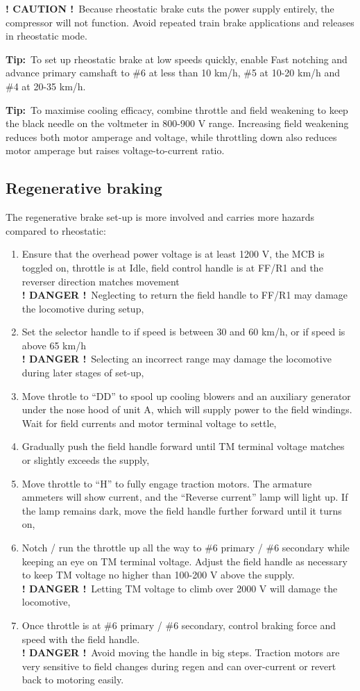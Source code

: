 \documentclass[11pt, a4paper]{article}
\newcommand{\brakemode}[1]{%
    \begingroup
    \setlength{\fboxsep}{0pt}%
    \raisebox{0.1em}{%
        \colorbox{red}{%
            \parbox[c][1.4em][c]{1.4em}{%
                \centering
                \color{black}\bfseries #1%
            }%
        }%
    }%
    \endgroup
}
\newcommand{\danger}{\textbf{\color{red} ! DANGER !}}
\newcommand{\caution}{\textbf{\color{orange} ! CAUTION !}}
\newcommand{\Tip}{\textbf{Tip:}}
\begin{document}
\caution\ Because rheostatic brake cuts the power supply entirely, the compressor will not function. Avoid repeated train brake applications and releases in rheostatic mode.

\Tip\ To set up rheostatic brake at low speeds quickly, enable Fast notching and advance primary camshaft to \#6 at less than 10 km/h, \#5 at 10-20 km/h and \#4 at 20-35 km/h.

\Tip\ To maximise cooling efficacy, combine throttle and field weakening to keep the black needle on the voltmeter in 800-900 V range. Increasing field weakening reduces both motor amperage and voltage, while throttling down also reduces motor amperage but raises voltage-to-current ratio.
\newpage

\subsection{Regenerative braking}
The regenerative brake set-up is more involved and carries more hazards compared to rheostatic:
\begin{enumerate}
\item Ensure that the overhead power voltage is at least 1200 V, the MCB is toggled on, throttle is at Idle, field control handle is at FF/R1 and the reverser direction matches movement\\
\danger\ Neglecting to return the field handle to FF/R1 may damage the locomotive during setup,
\item Set the selector handle to \brakemode{S} if speed is between 30 and 60 km/h, or \brakemode{P} if speed is above 65 km/h\\
\danger\ Selecting an incorrect range may damage the locomotive during later stages of set-up,
\item Move throtle to ``DD'' to spool up cooling blowers and an auxiliary generator under the nose hood of unit A, which will supply power to the field windings. Wait for field currents and motor terminal voltage to settle,
\item Gradually push the field handle forward until TM terminal voltage matches or slightly exceeds the supply,
\item Move throttle to ``H'' to fully engage traction motors. The armature ammeters will show current, and the ``Reverse current'' lamp will light up. If the lamp remains dark, move the field handle further forward until it turns on,
\item Notch / run the throttle up all the way to \#6 primary / \#6 secondary while keeping an eye on TM terminal voltage. Adjust the field handle as necessary to keep TM voltage no higher than 100-200 V above the supply.\\
\danger\ Letting TM voltage to climb over 2000 V will damage the locomotive,
\item Once throttle is at \#6 primary / \#6 secondary, control braking force and speed with the field handle.\\
\danger\ Avoid moving the handle in big steps. Traction motors are very sensitive to field changes during regen and can over-current or revert back to motoring easily.
\end{enumerate}
\end{document}
